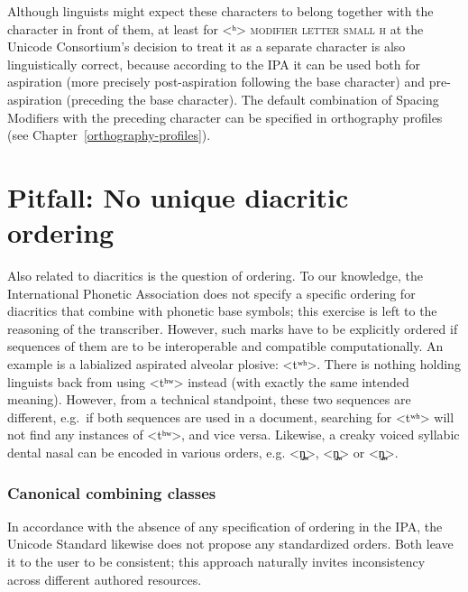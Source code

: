 Although linguists might expect these characters to belong together with the
character in front of them, at least for <ʰ> \textsc{modifier letter small h} at
 the Unicode Consortium's decision to treat it as a separate character
is also linguistically correct, because according to the IPA it can be used both
for aspiration (more precisely post-aspiration following the base character) and
pre-aspiration (preceding the base character). The default combination of Spacing Modifiers with
the preceding character can be specified in orthography profiles (see
Chapter~\ref{orthography-profiles}).

\section{Pitfall: No unique diacritic ordering}
\label{pitfall-no-unique-diacritic-ordering}

Also related to diacritics is the question of ordering. To our knowledge, the
International Phonetic Association does not specify a specific ordering for
diacritics that combine with phonetic base symbols; this exercise is left to the
reasoning of the transcriber. However, such marks have to be explicitly ordered
if sequences of them are to be interoperable and compatible computationally. An example is a
labialized aspirated alveolar plosive: <tʷʰ>. There is nothing holding linguists
back from using <tʰʷ> instead (with exactly the same intended meaning). However,
from a technical standpoint, these two sequences are different, e.g.~if both
sequences are used in a document, searching for <tʷʰ> will not find any
instances of <tʰʷ>, and vice versa. Likewise, a creaky voiced syllabic dental
nasal can be encoded in various orders, e.g. <n̪̰̩>, <n̩̰̪> or <n̩̪̰>.

\subsubsection*{Canonical combining classes}

In accordance with the absence of any specification of ordering in the IPA, the
Unicode Standard likewise does not propose any standardized orders. Both leave it
to the user to be consistent; this approach naturally invites inconsistency across 
different authored resources.


